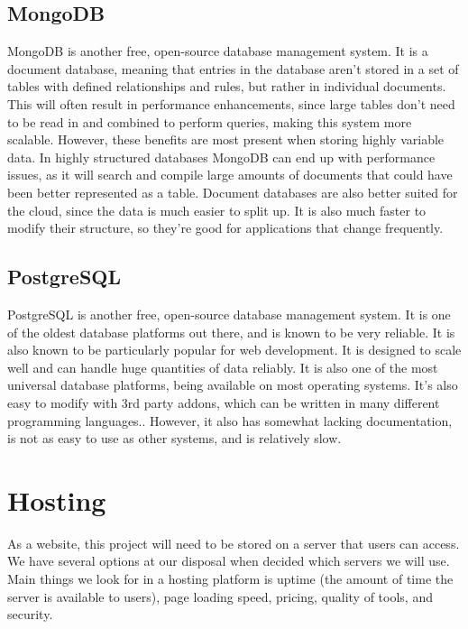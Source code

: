 \documentclass[onecolumn, draftclsnofoot,10pt, compsoc]{IEEEtran}
\begin{document}
    \subsection{MongoDB}
    
        MongoDB is another free, open-source database management system.
        It is a document database, meaning that entries in the database aren't stored in a set of tables with defined relationships and rules, but rather in individual documents\cite{e3}.
        This will often result in performance enhancements, since large tables don't need to be read in and combined to perform queries, making this system more scalable\cite{e4}.
        However, these benefits are most present when storing highly variable data. 
        In highly structured databases MongoDB can end up with performance issues, as it will search and compile large amounts of documents that could have been better represented as a table\cite{e1}.
        Document databases are also better suited for the cloud, since the data is much easier to split up.
        It is also much faster to modify their structure, so they're good for applications that change frequently\cite{e4}.
        
    
    \subsection{PostgreSQL}
    
        PostgreSQL is another free, open-source database management system. It is one of the oldest database platforms out there, and is known to be very reliable. It is also known to be particularly popular for web development\cite{e1}. It is designed to scale well and can handle huge quantities of data reliably. It is also one of the most universal database platforms, being available on most operating systems. It's also easy to modify with 3rd party addons, which can be written in many different programming languages.\cite{e5}.
        However, it also has somewhat lacking documentation, is not as easy to use as other systems, and is relatively slow\cite{e1}.

\section{Hosting}

    As a website, this project will need to be stored on a server that users can access. We have several options at our disposal when decided which servers we will use. Main things we look for in a hosting platform is uptime (the amount of time the server is available to users), page loading speed, pricing, quality of tools, and security.
\end{document}
